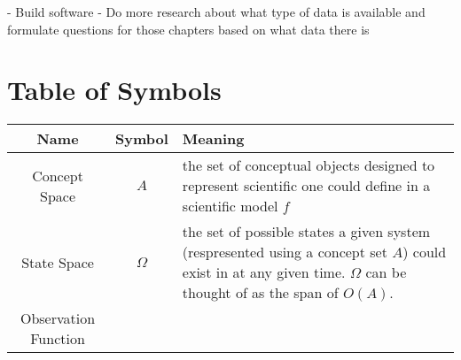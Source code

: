 \documentclass[]{article}
\begin{document}
- Build software
- Do more research about what type of data is available and formulate questions for those chapters based on what data there is






\hypertarget{table-of-symbols}{%
\section{Table of Symbols}\label{table-of-symbols}}
\renewcommand*{\arraystretch}{1.6}

\begin{longtable}[]{@{}ccl@{}}
\toprule
\begin{minipage}[b]{0.25\columnwidth}\centering
Name\strut
\end{minipage} & \begin{minipage}[b]{0.23\columnwidth}\centering
Symbol\strut
\end{minipage} & \begin{minipage}[b]{0.42\columnwidth}\raggedright
Meaning\strut
\end{minipage}\tabularnewline
\midrule
\endhead
\begin{minipage}[t]{0.25\columnwidth}\centering
Concept Space\strut
\end{minipage} & \begin{minipage}[t]{0.23\columnwidth}\centering
\(A\)\strut
\end{minipage} & \begin{minipage}[t]{0.42\columnwidth}\raggedright
the set of conceptual objects designed to represent scientific one could
define in a scientific model \(f\)\strut
\end{minipage}\tabularnewline
\begin{minipage}[t]{0.25\columnwidth}\centering
State Space\strut
\end{minipage} & \begin{minipage}[t]{0.23\columnwidth}\centering
\(\Omega\)\strut
\end{minipage} & \begin{minipage}[t]{0.42\columnwidth}\raggedright
the set of possible states a given system (respresented using a concept
set \(A\)) could exist in at any given time. \(\Omega\) can be thought
of as the span of \(O(A)\).\strut
\end{minipage}\tabularnewline
\begin{minipage}[t]{0.25\columnwidth}\centering
Observation Function\strut
\end{minipage} & \begin{minipage}[t]{0.23\columnwidth}\centering

\end{minipage}
\end{longtable}
\end{document}
